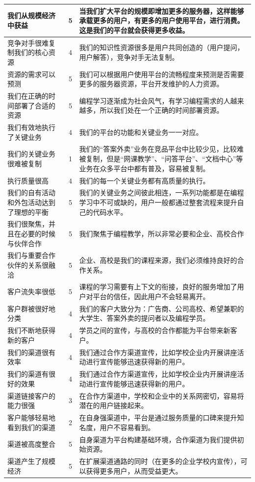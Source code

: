 \documentclass[a4paper]{ctexart}
\begin{document}
\begin{table}[h]
  \centering
\begin{tabular}{|p{3.5cm}|c|p{10cm}|}
  \hline
  我们从规模经济中获益 & 5 & 当我们扩大平台的规模即增加更多的服务器，这样能够承载更多的用户，有更多的用户使用平台，进行消费。这是我们的平台就会获得更多收益。\\
  \hline
  竞争对手很难复制我们的核心资源 & 4 & 我们的知识性资源很多是用户共同创造的（用户提问，用户解答），竞争对手无法复制。\\
  \hline
  资源的需求可以预测 & 5 & 我们可以根据用户使用平台的流畅程度来预测是否需要更多的服务器资源，平台开发维护的人力资源。\\
  \hline
  我们在正确的时间部署了合适的资源 & 5 & 编程学习逐渐成为社会风气，有学习编程需求的人越来越多，所以我们处在一个正确的时间部署资源。\\
  \hline
  我们有效地执行了关键业务 & 4 & 我们的平台的功能和关键业务一一对应。\\
  \hline
  我们的关键业务很难被复制 & 1 & 我们的“答案外卖”业务在竞品平台中比较少见，比较难被复制，但是“网课教学”、“问答平台”、“文档中心”等业务在众多平台中都有普及，容易被复制。\\
  \hline
  执行质量很高 & 4 & 我们的每一个关键业务都有高质量的执行。\\
  \hline
  我们的自有活动和外包活动达到了理想的平衡 & 5 & 我们的关键业务之间彼此相连，一系列功能都是在编程学习中不可或缺的，用户一般都通过整套流程来提升自己的代码水平。\\
  \hline
  我们很聚焦，并且在必要的时候与伙伴合作 & 5 & 我们聚焦于编程教学，所以非常必要和企业、高校合作\\
  \hline
  我们与重要合作伙伴的关系很融洽 & 5 & 企业、高校是我们的课程来源，我们必须维持良好的合作关系。\\
  \hline
  客户流失率很低 & 5 & 课程的学习需要有上下文的衔接，良好的服务增加了用户对平台的信任，因此用户不会轻易离开。\\
  \hline
  客户群被很好地分类 & 4 & 我们的客户大致分为：广告商、公司高校、希望兼职的大学生、答案外卖的提问者以及编程学员。\\
  \hline
  我们不断地获得新的客户 & 4 & 学员之间的宣传，与高校的合作都能为平台带来新客户。\\
  \hline
  我们的渠道很有效率 & 4 & 我们通过合作方渠道宣传，比如学校企业内开展讲座活动进行宣传能够迅速获得新的用户。\\
  \hline
  我们的渠道有很好的效果 & 4 & 我们通过合作方渠道宣传，比如学校企业内开展讲座活动进行宣传能够迅速获得新的用户。\\
  \hline
  渠道链接客户的能力很强 & 3 & 在合作方渠道中，学校和企业中的关系网密切，容易将潜在的用户链接起来。\\
  \hline
  客户能够轻易地看到我们的渠道 & 2 & 在自身强渠道中，平台是通过服务质量的口碑来提升知名度，用户不容易看到。\\
  \hline
  渠道被高度整合 & 5 & 自身渠道为平台构建基础环境，合作渠道为我们提供初始资源。\\
  \hline
  渠道产生了规模经济 & 5 & 在扩展渠道通路的同时（在更多的企业学校内宣传），可以获得更多用户，从而受益更大。\\
  \hline
\end{tabular}
\end{table}
\end{document}
